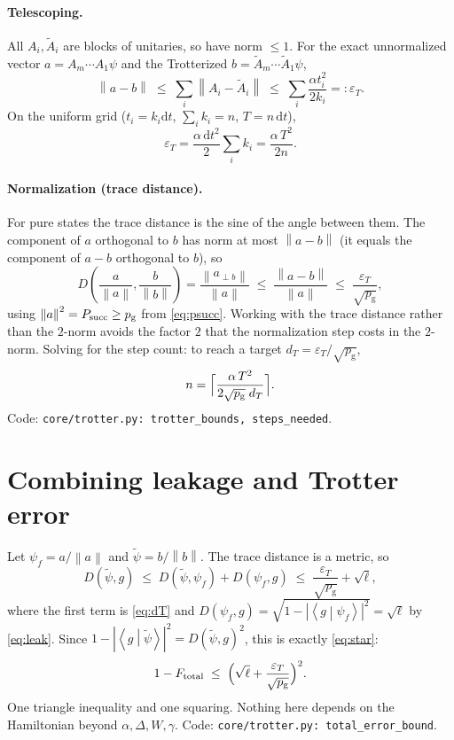 \documentclass[11pt]{article}
\theoremstyle{definition}
\newcommand{\norm}[1]{\left\lVert #1\right\rVert}
\newcommand{\abs}[1]{\left\lvert #1\right\rvert}
\newcommand{\braket}[2]{\left\langle #1 \middle| #2\right\rangle}
\newcommand{\eps}{\varepsilon}
\newcommand{\pg}{p_{\mathrm g}}
\newcommand{\code}[1]{\texttt{#1}}
\begin{document}
\paragraph{Telescoping.} All $A_i,\tilde A_i$ are blocks of unitaries, so have norm $\le1$. For the exact unnormalized vector
$a=A_m\cdots A_1\psi$ and the Trotterized $b=\tilde A_m\cdots\tilde A_1\psi$,
\begin{equation}
  \norm{a-b}\;\le\;\sum_i\norm{A_i-\tilde A_i}\;\le\;\sum_i\frac{\alpha t_i^2}{2k_i}=:\eps_T .
\end{equation}
On the uniform grid ($t_i=k_i\mathrm dt$, $\sum_ik_i=n$, $T=n\,\mathrm dt$),
\begin{equation}\label{eq:epsT}
  \eps_T=\frac{\alpha\,\mathrm dt^2}{2}\sum_ik_i=\frac{\alpha\,T^2}{2n}.
\end{equation}

\paragraph{Normalization (trace distance).} For pure states the trace distance is the sine of the angle between them. The
component of $a$ orthogonal to $b$ has norm at most $\norm{a-b}$ (it equals the component of $a-b$ orthogonal to $b$), so
\begin{equation}\label{eq:dT}
  D\!\left(\frac a{\norm a},\frac b{\norm b}\right)=\frac{\norm{a_{\perp b}}}{\norm a}\;\le\;\frac{\norm{a-b}}{\norm a}\;\le\;\frac{\eps_T}{\sqrt{\pg}},
\end{equation}
using $\norm a^2=P_{\rm succ}\ge\pg$ from \eqref{eq:psucc}. Working with the trace distance rather than the $2$-norm avoids the
factor $2$ that the normalization step costs in the $2$-norm. Solving for the step count: to reach a target
$d_T=\eps_T/\sqrt{\pg}$,
\begin{equation}\label{eq:n}
  n=\Bigl\lceil\frac{\alpha\,T^2}{2\sqrt{\pg}\;d_T}\Bigr\rceil .
\end{equation}
Code: \code{core/trotter.py: trotter\_bounds, steps\_needed}.

\section{Combining leakage and Trotter error}\label{sec:combine}
Let $\psi_f=a/\norm a$ and $\tilde\psi=b/\norm b$. The trace distance is a metric, so
\begin{equation}
  D(\tilde\psi,g)\;\le\;D(\tilde\psi,\psi_f)+D(\psi_f,g)\;\le\;\frac{\eps_T}{\sqrt{\pg}}+\sqrt{\ell},
\end{equation}
where the first term is \eqref{eq:dT} and $D(\psi_f,g)=\sqrt{1-\abs{\braket g{\psi_f}}^2}=\sqrt\ell$ by \eqref{eq:leak}. Since
$1-\abs{\braket g{\tilde\psi}}^2=D(\tilde\psi,g)^2$, this is exactly \eqref{eq:star}:
\[
  1-F_{\rm total}\;\le\;\Bigl(\sqrt\ell+\frac{\eps_T}{\sqrt{\pg}}\Bigr)^2 .
\]
One triangle inequality and one squaring. Nothing here depends on the Hamiltonian beyond $\alpha,\Delta,W,\gamma$.
Code: \code{core/trotter.py: total\_error\_bound}.
\end{document}

